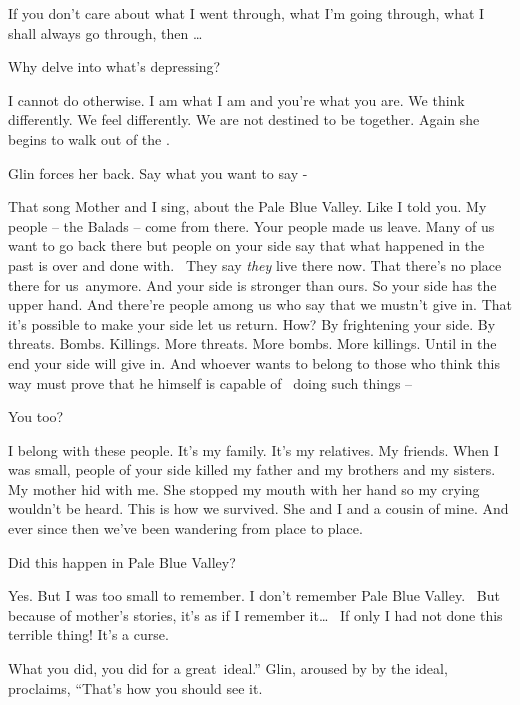 \documentclass[letterpaper]{article}
\begin{document}
{\textquotedbl}If you don't care about what I went through, what I'm going through, what I shall always go through, then
{\dots}{\textquotedbl} 

{\textquotedbl}Why delve into what's depressing?{\textquotedbl} 

{\textquotedbl}I cannot do otherwise. I am what I am and you're what you are. We think differently. We feel differently.
We are not destined to be together.{\textquotedbl} Again she begins to walk out of the . 

Glin forces her back. {\textquotedbl}Say what you want to say -{\textquotedbl} 

{\textquotedbl}That song Mother and I sing, about the Pale Blue Valley. Like I told you. My people -- the Balads -- come
from there. Your people made us leave. Many of us want to go back there but people on your side say that what happened
in the past is over and done with. ~They say \textit{they }live there now. That there's no place there for us~anymore.
And your side is stronger than ours. So your side has the upper hand. And there're people among us who say that we
mustn't give in. That it's possible to make your side let us return. How? By frightening your side. By threats. Bombs.
Killings. More threats. More bombs. More killings. Until in the end your side will give in. And whoever wants to belong
to those who think this way must prove that he himself is capable of~ doing such things --{\textquotedbl} 

{\textquotedbl}You too?{\textquotedbl} 

{\textquotedbl}I belong with these people. It's my family. It's my relatives. My friends. When I was small, people of
your side killed my father and my brothers and my sisters. My mother hid with me. She stopped my mouth with her hand so
my crying wouldn't be heard. This is how we survived. She and I and a cousin of mine. And ever since then we've been
wandering from place to place.{\textquotedbl} 

{\textquotedbl}Did this happen in Pale Blue Valley?{\textquotedbl} 

{\textquotedbl}Yes. But I was too small to remember. I don't remember Pale Blue Valley. ~But because of mother's
stories, it's as if I remember it{\dots} \ If only I had not done this terrible thing! It's a curse.{\textquotedbl} 

{\textquotedbl}What you did, you did for a great~ideal.'' Glin, aroused by\textcolor{red}{ }by the ideal, proclaims,
``That's how you should see it.{\textquotedbl} 
\end{document}
